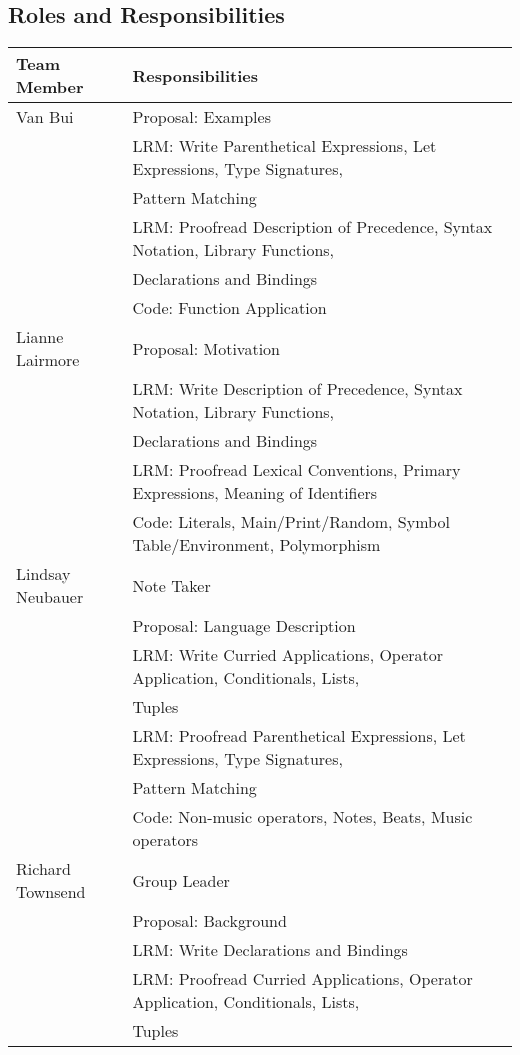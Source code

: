 	\subsection{Roles and Responsibilities}
		\begin{table}[htdp]
		\begin{tabular}{|l|l|}
		\hline
		Team Member & Responsibilities \\ 
		\hline
		Van Bui & Proposal: Examples \\
					& LRM: Write Parenthetical Expressions, Let Expressions, Type Signatures, \\
					& Pattern Matching \\
					& LRM: Proofread  Description of Precedence, Syntax Notation, Library Functions, \\ 
					& Declarations and Bindings \\
					& Code: Function Application \\
		Lianne Lairmore & Proposal: Motivation \\
									& LRM: Write Description of Precedence, Syntax Notation, Library Functions, \\
									& Declarations and Bindings \\
									& LRM: Proofread Lexical Conventions, Primary Expressions, Meaning of Identifiers \\
									& Code: Literals, Main/Print/Random, Symbol Table/Environment, Polymorphism \\
		Lindsay Neubauer & Note Taker \\
										& Proposal: Language Description\\
										& LRM: Write Curried Applications, Operator Application, Conditionals, Lists, \\
										& Tuples \\
										& LRM: Proofread Parenthetical Expressions, Let Expressions, Type Signatures, \\ 
										& Pattern Matching \\
										& Code: Non-music operators, Notes, Beats, Music operators \\
		Richard Townsend & Group Leader \\
										& Proposal: Background \\
										& LRM:  Write Declarations and Bindings \\
										& LRM: Proofread Curried Applications, Operator Application, Conditionals, Lists, \\
										& Tuples \\

\end{tabular}
\end{table}
